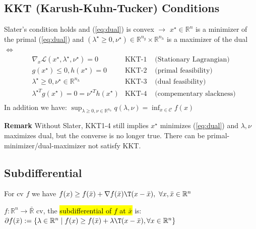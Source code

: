 \subsection{KKT (Karush-Kuhn-Tucker) Conditions}

\begin{theorem}
	Slater's condition holds
	and (\ref{eq:dual}) is convex
	$\rightarrow$
	$x^\star \in \mathbb{R}^{n}$ is a minimizer of the primal (\ref{eq:dual})
	and $(\lambda^\star \ge 0,\nu^\star) \in \mathbb{R}^{n_g}\times\mathbb{R}^{n_h}$ is a maximizer of the dual
	$\Leftrightarrow$
	$$\begin{aligned}
			 & \nabla_x\mathcal{L}(x^\star,\lambda^\star,\nu^\star)=0
			 & \text{KKT-1 }
			 & \text{(Stationary Lagrangian)}
			\\
			 & g(x^\star)\le0, h(x^\star)=0
			 & \text{KKT-2 }
			 & \text{(primal feasibility)}
			\\
			 & \lambda^\star\ge0, \nu^\star \in \mathbb{R}^{n_h}
			 & \text{KKT-3 }
			 & \text{(dual feasibility)}
			\\
			 & \lambda^{\star T} g(x^\star)=0=\nu^{\star T} h(x^\star)
			 & \text{KKT-4 }
			 & \text{(compementary slackness)}
			\\
		\end{aligned}$$
	In addition we have:
	$\sup_{\lambda\ge0,\nu\in\mathbb{R}^{n_h}}q(\lambda,\nu)=\inf_{x\in\mathcal{C}}f(x)$
\end{theorem}

\textbf{Remark} Without Slater,
KKT1-4 still implies $x^\star$ minimizes (\ref{eq:dual})
and $\lambda,\nu$ maximizes dual,
but the converse is no longer true.
There can be primal-minimizer/dual-maximizer not satisfy KKT.

\subsection{Subdifferential}

For cv $f$ we have
$f(x)\ge f(\bar{x})+\nabla f(\bar{x})\T(x-\bar{x}),\ \forall x,\bar{x}\in \mathbb{R}^{n}$

\begin{definition}
	$f: \mathbb{R}^{n} \rightarrow \bar{\mathbb{R}}$ cv,
	the \textcolor{hltext}{\hl{ subdifferential of $f$ at $\bar{x}$ }}is:
	$\partial f(\bar{x}):=
		\{\lambda \in \mathbb{R}^{n} \mid
		f(x)\ge f(\bar{x})+\lambda\T(x-\bar{x}),
		\forall x \in \mathbb{R}^{n}
		\}$
	\label{def:subdifferential}
\end{definition}

